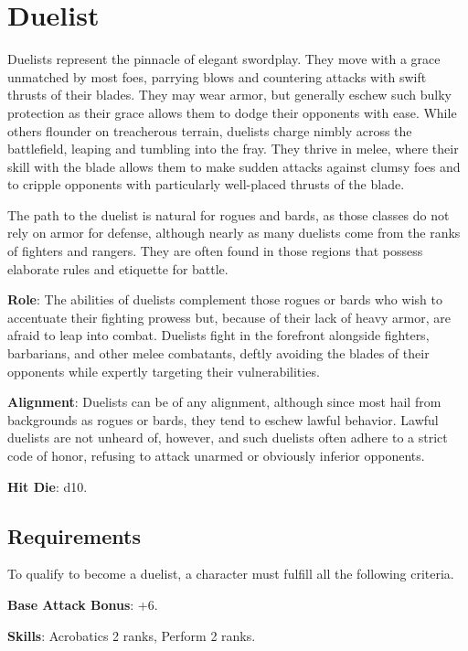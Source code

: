 \section{Duelist}

\label{f0}				
Duelists represent the pinnacle of elegant swordplay. They move with a grace unmatched by most foes, parrying blows and countering attacks with swift thrusts of their blades. They may wear armor, but generally eschew such bulky protection as their grace allows them to dodge their opponents with ease. While others flounder on treacherous terrain, duelists charge nimbly across the battlefield, leaping and tumbling into the fray. They thrive in melee, where their skill with the blade allows them to make sudden attacks against clumsy foes and to cripple opponents with particularly well-placed thrusts of the blade.
				
The path to the duelist is natural for rogues and bards, as those classes do not rely on armor for defense, although nearly as many duelists come from the ranks of fighters and rangers. They are often found in those regions that possess elaborate rules and etiquette for battle. 
				
\textbf{Role}: The abilities of duelists complement those rogues or bards who wish to accentuate their fighting prowess but, because of their lack of heavy armor, are afraid to leap into combat. Duelists fight in the forefront alongside fighters, barbarians, and other melee combatants, deftly avoiding the blades of their opponents while expertly targeting their vulnerabilities.
				
\textbf{Alignment}: Duelists can be of any alignment, although since most hail from backgrounds as rogues or bards, they tend to eschew lawful behavior. Lawful duelists are not unheard of, however, and such duelists often adhere to a strict code of honor, refusing to attack unarmed or obviously inferior opponents.
				
\textbf{Hit Die}: d10.
				
\subsection{Requirements}

				
To qualify to become a duelist, a character must fulfill all the following criteria.
				
\textbf{Base Attack Bonus}: +6.
				
\textbf{Skills}: Acrobatics 2 ranks, Perform 2 ranks.
				

